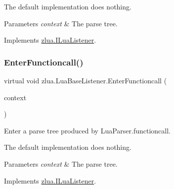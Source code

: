 The default implementation does nothing.


\begin{DoxyParams}{Parameters}
{\em context} & The parse tree.\\
\hline
\end{DoxyParams}


Implements \mbox{\hyperlink{interfacezlua_1_1_i_lua_listener_a17d342070a88fadc98dec2456e2ba0dc}{zlua.\+I\+Lua\+Listener}}.

\mbox{\label{classzlua_1_1_lua_base_listener_a5a20690d44ed7bea5265200a10bd3ade}} 
\subsubsection{\texorpdfstring{Enter\+Functioncall()}{EnterFunctioncall()}}
{\footnotesize\ttfamily virtual void zlua.\+Lua\+Base\+Listener.\+Enter\+Functioncall (\begin{DoxyParamCaption}\item[{\mbox{[}\+Not\+Null\mbox{]} \mbox{\hyperlink{classzlua_1_1_lua_parser_1_1_functioncall_context}{Lua\+Parser.\+Functioncall\+Context}}}]{context }\end{DoxyParamCaption})\hspace{0.3cm}{\ttfamily [virtual]}}



Enter a parse tree produced by Lua\+Parser.\+functioncall. 

The default implementation does nothing.


\begin{DoxyParams}{Parameters}
{\em context} & The parse tree.\\
\hline
\end{DoxyParams}


Implements \mbox{\hyperlink{interfacezlua_1_1_i_lua_listener_aed7b99a3790f95b4b5e3d7cac6d3361d}{zlua.\+I\+Lua\+Listener}}.

\mbox{\label{classzlua_1_1_lua_base_listener_a3882098639066deade08be5eb8d94f70}} 
